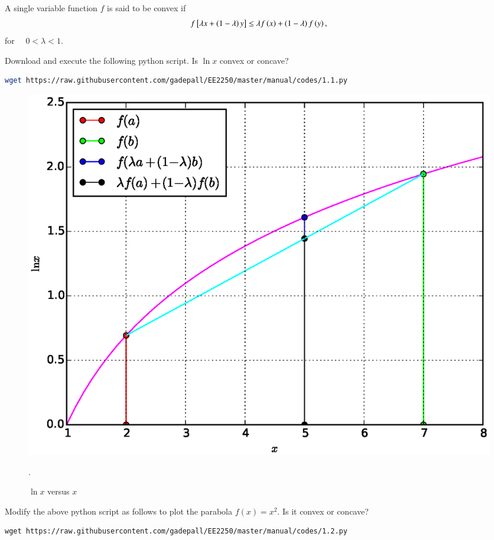 \documentclass[journal,12pt,twocolumn]{IEEEtran}
\begin{document}
A single variable function $f$ is said to be convex if
%
\begin{align}
\label{ch1_convex_def}
f{}\left[\lambda x + \left(1-\lambda\right)y\right] \leq \lambda f\left(x\right) + \left(1-\lambda\right)f\left(y\right), 
\end{align}
%
for $\quad 0 < \lambda < 1$.
\begin{problem}
Download and execute the following python script. Is  $\ln x$ convex or  concave?
\end{problem}
%
\begin{lstlisting}[language=sh]
wget https://raw.githubusercontent.com/gadepall/EE2250/master/manual/codes/1.1.py
\end{lstlisting}
%
\begin{figure}[!ht]
\centering
\includegraphics[width=\columnwidth]{./figs/1.1.eps}
\caption{ $\ln x$ versus $x$}.
\label{fig.1.1}	
\end{figure}
%
\begin{problem}
Modify the above python script as follows to plot the parabola $f(x) = x^2$. Is it convex or concave?
\end{problem}
\begin{lstlisting}
wget https://raw.githubusercontent.com/gadepall/EE2250/master/manual/codes/1.2.py
\end{lstlisting}
%
\end{document}
